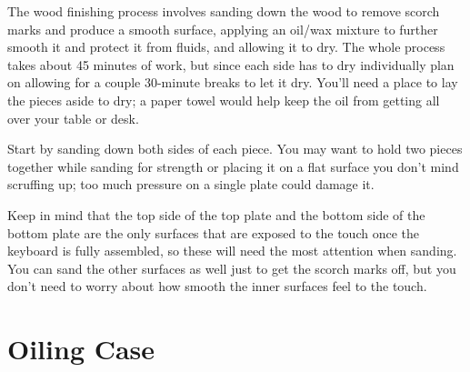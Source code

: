 \documentclass{article}
\begin{document}
The wood finishing process involves sanding down the wood to remove
scorch marks and produce a smooth surface, applying an oil/wax mixture
to further smooth it and protect it from fluids, and allowing it to
dry. The whole process takes about 45 minutes of work, but since each
side has to dry individually plan on allowing for a couple 30-minute
breaks to let it dry. You'll need a place to lay the pieces aside to
dry; a paper towel would help keep the oil from getting all over your
table or desk.

\vspace{1em}

Start by sanding down both sides of each piece. You may want to hold
two pieces together while sanding for strength or placing it on a flat
surface you don't mind scruffing up; too much pressure on a single
plate could damage it.

\vspace{1em}
\noindent{}
\vspace{1em}

Keep in mind that the top side of the top plate and the bottom side of
the bottom plate are the only surfaces that are exposed to the touch
once the keyboard is fully assembled, so these will need the most
attention when sanding. You can sand the other surfaces as well just
to get the scorch marks off, but you don't need to worry about how
smooth the inner surfaces feel to the touch.

\section{Oiling Case}
\end{document}
